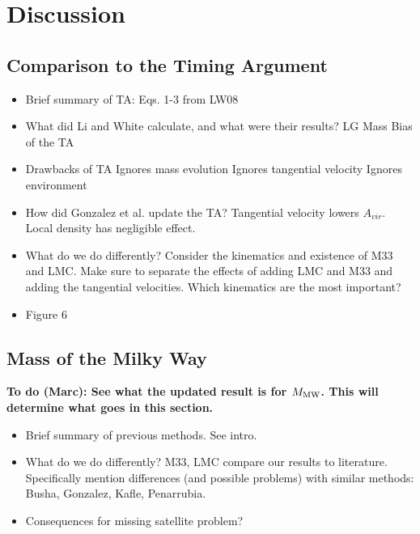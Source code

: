 \documentclass[iop,apj,twocolappendix,numberedappendix]{emulateapj}
\newcommand{\MMW}{{\rm M}_{\rm MW}}
\def\MMW{M_{\rm MW}}
\newcommand{\todo}[2]{{\bf To do (#1): #2}}
\begin{document}

\section{Discussion}
\label{sec:discuss}

\subsection{Comparison to the Timing Argument}
\label{sec:TA}

\begin{itemize}
\item Brief summary of TA: Eqs. 1-3 from LW08
\item What did Li and White calculate, and what were their results?
	\subitem LG Mass
	\subitem Bias of the TA
\item Drawbacks of TA
	\subitem Ignores mass evolution
	\subitem Ignores tangential velocity
	\subitem Ignores environment
\item How did Gonzalez et al. update the TA? 
	\subitem Tangential velocity lowers $A_{vir}$.
	\subitem Local density has negligible effect.
\item What do we do differently?
	\subitem Consider the kinematics and existence of M33 and LMC.
	\subitem Make sure to separate the effects of adding LMC and M33 and adding the tangential velocities.
	\subitem Which kinematics are the most important?
\item Figure 6
\end{itemize}

\subsection{Mass of the Milky Way}
\label{sec:MW_discuss}
\todo{Marc}{See what the updated result is for $\MMW$. This will determine what goes in this section.}
\begin{itemize}
\item Brief summary of previous methods. See intro.
\item What do we do differently?
	\subitem M33, LMC
	\subitem compare our results to literature.
	\subitem \subitem Specifically mention differences (and possible problems) with similar methods: Busha, Gonzalez, Kafle, Penarrubia.
\item Consequences for missing satellite problem?
\end{itemize}
\end{document}
